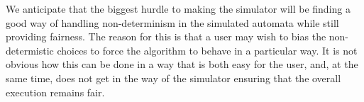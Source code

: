 \documentclass{scrartcl}
\begin{document}
We anticipate that the biggest hurdle to making the simulator will be finding a
good way of handling non-determinism in the simulated automata while still
providing fairness. The reason for this is that a user may wish to bias the
non-determistic choices to force the algorithm to behave in a particular way.
It is not obvious how this can be done in a way that is both easy for the user,
and, at the same time, does not get in the way of the simulator ensuring that
the overall execution remains fair.
\end{document}
